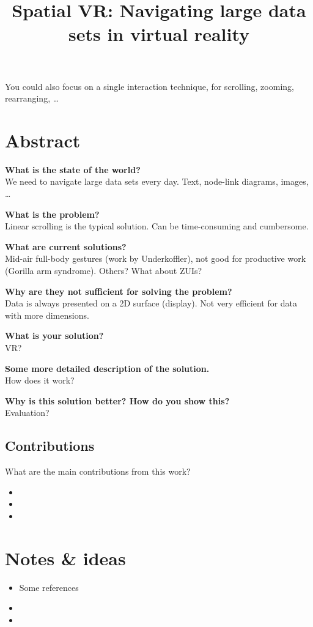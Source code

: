 



\title{Spatial VR: Navigating large data sets in virtual reality}\maketitle
You could also focus on a single interaction technique, \eg for scrolling, zooming, rearranging, \dots

\section{Abstract}

\textbf{What is the state of the world?}\\
We need to navigate large data sets every day. Text, node-link diagrams, images, \dots

\textbf{What is the problem?}\\
Linear scrolling is the typical solution. Can be time-consuming and cumbersome.

\textbf{What are current solutions?}\\
Mid-air full-body gestures (\eg work by Underkoffler), not good for productive work (Gorilla arm syndrome).
Others? What about ZUIs?

\textbf{Why are they not sufficient for solving the problem?}\\
Data is always presented on a 2D surface (\ie display). Not very efficient for data with more dimensions.

\textbf{What is your solution?}\\
VR?

\textbf{Some more detailed description of the solution.}\\
How does it work?

\textbf{Why is this solution better? How do you show this?}\\
Evaluation?

\subsection{Contributions}
What are the main contributions from this work?
\begin{itemize}
  \setlength\itemsep{.1em}
  	\item 
	\item 
	\item 
\end{itemize}


\section{Notes \& ideas}
\begin{itemize}
  \setlength\itemsep{.1em}
	\item Some references \cite{Fender15, Poupyrev96, Zhai94}
	\item 
	\item 
\end{itemize}




